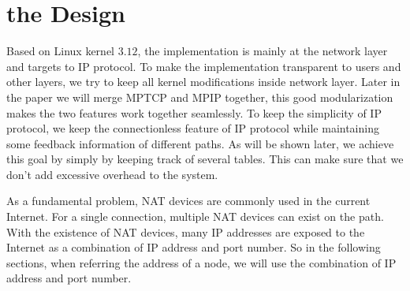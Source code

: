 \section{the Design}
\label{sec:design}
Based on Linux kernel $3.12$, the implementation is mainly at the network layer and targets to IP protocol. To make the implementation transparent to users and other layers, we try to keep all kernel modifications inside network layer. Later in the paper we will merge MPTCP and MPIP together, this good modularization makes the two features work together seamlessly. To keep the simplicity of IP protocol, we keep the connectionless feature of IP protocol while maintaining some feedback information of different paths. As will be shown later, we achieve this goal by simply by keeping track of several tables. This can make sure that we don't add excessive overhead to the system.

As a fundamental problem, NAT devices are commonly used in the current Internet. For a single connection, multiple NAT devices can exist on the path. With the existence of NAT devices, many IP addresses are exposed to the Internet as a combination of IP address and port number. So in the following sections, when referring the address of a node, we will use the combination of IP address and port number.


